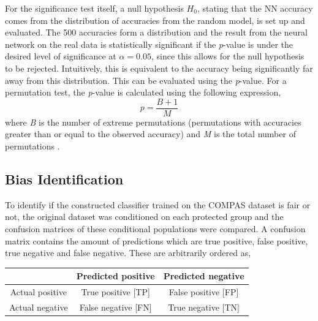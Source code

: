 \documentclass[11pt, fleqn, titlepage]{article}
\begin{document}
	For the significance test itself, a null hypothesis $H_{0}$, stating that the NN accuracy comes from the distribution of accuracies from the random model, is set up and evaluated. The 500 accuracies form a distribution and the result from the neural network on the real data is statistically significant if the \textit{p}-value is under the desired level of significance at $ \alpha = 0.05 $, since this allows for the null hypothesis to be rejected. Intuitively, this is equivalent to the accuracy being significantly far away from this distribution. 
	This can be evaluated using the \textit{p}-value. For a permutation test, the \textit{p}-value is calculated using the following expression,
	\begin{equation}\label{pval}
	p=\frac{B+1}{M}
	\end{equation}
	where \textit{B} is the number of extreme permutations (permutations with accuracies greater than or equal to the observed accuracy) and \textit{M} is the total number of permutations \cite{p-value}.
	
	
	\subsection{Bias Identification}\label{bias_id}
	To identify if the constructed classifier trained on the COMPAS dataset is fair or not, the original dataset was conditioned on each protected group and the confusion matrices of these conditional populations were compared. A confusion matrix contains the amount of predictions which are true positive, false positive, true negative and false negative. These are arbitrarily ordered as,	
	
	\begin{center}
		\bgroup
		\def\arraystretch{2}%
		\begin{tabular}{c | c c |}
			& Predicted positive & Predicted negative \\ 
			\hline 
			Actual positive & True positive [TP] & False positive [FP] \\
			Actual negative & False negative [FN] & True negative [TN] \\ 
			\hline
		\end{tabular}
		\egroup
	\end{center}
	
\end{document}
